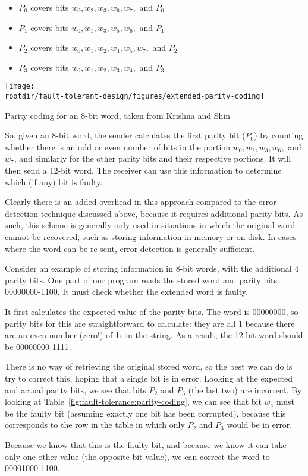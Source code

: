 \begin{itemize}
 \item $P_0$ covers bits $w_0, w_2, w_3, w_6, w_7,$ and $P_0$
 \item $P_1$ covers bits $w_0, w_1, w_3, w_5, w_6,$ and $P_1$
 \item $P_2$ covers bits $w_0, w_1, w_2, w_4, w_5, w_7,$ and $P_2$
 \item $P_3$ covers bits $w_0, w_1, w_2, w_3, w_4,$ and $P_3$
\end{itemize}

\begin{table}[!h]
\centering
\texttt{[image: \\rootdir/fault-tolerant-design/figures/extended-parity-coding]}
 \caption{Parity coding for an 8-bit word, taken from Krishna and Shin \cite{krishna99}}
 \label{fig:fault-tolerance:parity-coding}
\end{table}

So, given an 8-bit word, the sender calculates the first parity bit ($P_0$) by counting whether there is an odd or even number of bits in the portion $w_0, w_2, w_3, w_6,$ and  $w_7$, and similarly for the other parity bits and their respective portions. It will then send a 12-bit word. The receiver can use this information to determine which (if any) bit is faulty.

Clearly there is an added overhead in this approach compared to the error detection technique discussed above, because it requires additional parity bits. As such, this scheme is generally only used in situations in which the original word cannot be recovered, such as storing information in memory or on disk. In cases where the word can be re-sent, error detection is generally sufficient.


\begin{example}
Consider an example of storing information in 8-bit words, with the additional 4 parity bits. One part of our program reads the stored word and parity bits: 00000000-1100. It must check whether the extended word is faulty.

It first calculates the expected value of the parity bits. The word is 00000000, so parity bits for this are straightforward to calculate: they are all 1 because there are an even number (zero!) of 1s in the string. As a result, the 12-bit word should be 00000000-1111.

There is no way of retrieving the original stored word, so the best we can do is try to correct this, hoping that a single bit is in error. Looking at the expected and actual parity bits, we see that bits $P_2$ and $P_3$ (the last two) are incorrect. By looking at Table~\ref{fig:fault-tolerance:parity-coding}, we can see that bit $w_4$ must be the faulty bit (assuming exactly one bit has been corrupted), because this corresponds to the row in the table in which only $P_2$ and $P_3$ would be in error.

Because we know that this is the faulty bit, and because we know it can take only one other value (the opposite bit value), we can correct the word to 00001000-1100.

\end{example}

